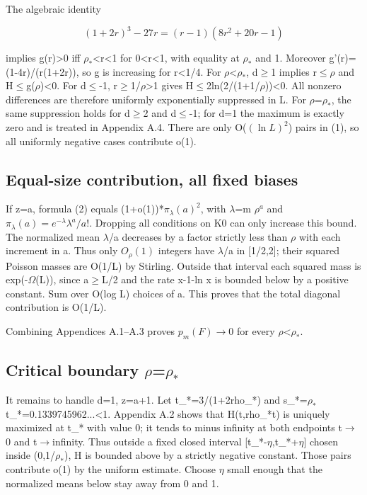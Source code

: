 \documentclass[11pt]{article}
\begin{document}
The algebraic identity

\[
(1+2r)^3-27r=(r-1)(8r^2+20r-1)
\]

implies g(r)>0 iff $\rho_{*}$<r<1 for 0<r<1, with equality at $\rho_{*}$ and 1. Moreover g'(r)=(1-4r)/(r(1+2r)), so g is increasing for r<1/4. For $\rho$<$\rho_{*}$, d\ensuremath{\geq}1 implies r\ensuremath{\leq}$\rho$ and H\ensuremath{\leq}g($\rho$)<0. For d\ensuremath{\leq}-1, r\ensuremath{\geq}1/$\rho$>1 gives H\ensuremath{\leq}2ln(2/(1+1/$\rho$))<0. All nonzero differences are therefore uniformly exponentially suppressed in L. For $\rho$=$\rho_{*}$, the same suppression holds for d\ensuremath{\geq}2 and d\ensuremath{\leq}-1; for d=1 the maximum is exactly zero and is treated in Appendix A.4. There are only O($(\ln L)^2$) pairs in (1), so all uniformly negative cases contribute o(1).

\subsection{Equal-size contribution, all fixed biases}

If z=a, formula (2) equals (1+o(1))*$\pi_\lambda(a)^2$, with $\lambda$=m $\rho^{a}$ and $\pi_\lambda(a)=e^{-\lambda}\lambda^a/a!$. Dropping all conditions on K0 can only increase this bound. The normalized mean $\lambda$/a decreases by a factor strictly less than $\rho$ with each increment in a. Thus only $O_\rho(1)$ integers have $\lambda$/a in [1/2,2]; their squared Poisson masses are O(1/L) by Stirling. Outside that interval each squared mass is exp(-$\Omega$(L)), since a\ensuremath{\geq}L/2 and the rate x-1-ln x is bounded below by a positive constant. Sum over O(log L) choices of a. This proves that the total diagonal contribution is O(1/L).

Combining Appendices A.1--A.3 proves $p_m(F)$\ensuremath{\to}0 for every $\rho$<$\rho_{*}$.

\subsection{Critical boundary $\rho$=$\rho_{*}$}

It remains to handle d=1, z=a+1. Let t\_*=3/(1+2rho\_*) and s\_*=$\rho_{*}$ t\_*=0.1339745962...<1. Appendix A.2 shows that H(t,rho\_*t) is uniquely maximized at t\_* with value 0; it tends to minus infinity at both endpoints t\ensuremath{\to}0 and t\ensuremath{\to}infinity. Thus outside a fixed closed interval [t\_*-$\eta$,t\_*+$\eta$] chosen inside (0,1/$\rho_{*}$), H is bounded above by a strictly negative constant. Those pairs contribute o(1) by the uniform estimate. Choose $\eta$ small enough that the normalized means below stay away from 0 and 1.
\end{document}
